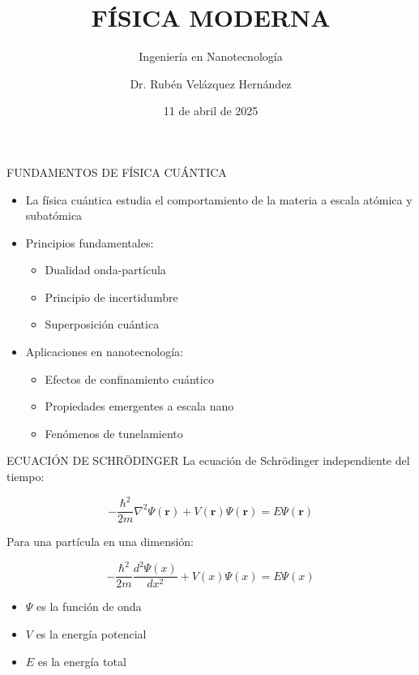 \documentclass[aspectratio=169]{beamer} %
\title{FÍSICA MODERNA}
\subtitle{Ingeniería en Nanotecnología}
\author{Dr. Rubén Velázquez Hernández}
\date{11 de abril de 2025}
\institute{Universidad Tecnológica de Querétaro}
\begin{document}
	
	\begin{frame}[plain]
		\titlepage
	\end{frame}
	
	\begin{frame}{FUNDAMENTOS DE FÍSICA CUÁNTICA}
		\begin{itemize}
			\item La física cuántica estudia el comportamiento de la materia a escala atómica y subatómica
			\item Principios fundamentales:
			\begin{itemize}
				\item Dualidad onda-partícula
				\item Principio de incertidumbre
				\item Superposición cuántica
			\end{itemize}
			\item Aplicaciones en nanotecnología:
			\begin{itemize}
				\item Efectos de confinamiento cuántico
				\item Propiedades emergentes a escala nano
				\item Fenómenos de tunelamiento
			\end{itemize}
		\end{itemize}
	\end{frame}
	
	\begin{frame}{ECUACIÓN DE SCHRÖDINGER}
		La ecuación de Schrödinger independiente del tiempo:
		
		\begin{equation}
			-\frac{\hbar^2}{2m}\nabla^2\Psi(\mathbf{r}) + V(\mathbf{r})\Psi(\mathbf{r}) = E\Psi(\mathbf{r})
		\end{equation}
		
		Para una partícula en una dimensión:
		
		\begin{equation}
			-\frac{\hbar^2}{2m}\frac{d^2\Psi(x)}{dx^2} + V(x)\Psi(x) = E\Psi(x)
		\end{equation}
		
		\begin{itemize}
			\item $\Psi$ es la función de onda
			\item $V$ es la energía potencial
			\item $E$ es la energía total
		\end{itemize}
	\end{frame}
	
\end{document}
